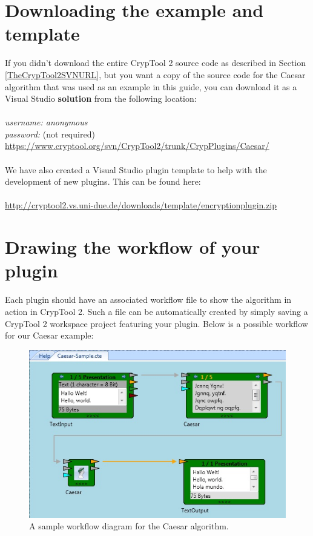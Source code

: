 \section{Downloading the example and template}
\label{sec:DownloadingTheExampleAndTemplate}

If you didn't download the entire CrypTool 2 source code as described in Section \ref{TheCrypTool2SVNURL}, but you want a copy of the source code for the Caesar algorithm that was used as an example in this guide, you can download it as a Visual Studio \textbf{solution} from the following location:\\\\
\textit{username: anonymous\\
password:} (not required)\\
\url{https://www.cryptool.org/svn/CrypTool2/trunk/CrypPlugins/Caesar/}\\\\
We have also created a Visual Studio plugin template to help with the development of new plugins. This can be found here:\\\\
\url{http://cryptool2.vs.uni-due.de/downloads/template/encryptionplugin.zip}
\clearpage

\section{Drawing the workflow of your plugin}
\label{DrawingTheWorkfloweOfYourPlugin}

Each plugin should have an associated workflow file to show the algorithm in action in CrypTool 2. Such a file can be automatically created by simply saving a CrypTool 2 workspace project featuring your plugin. Below is a possible workflow for our Caesar example:

\begin{figure}[h]
	\centering
		\includegraphics{figures/sample.jpg}
	\caption{A sample workflow diagram for the Caesar algorithm.}
	\label{fig:sample}
\end{figure}